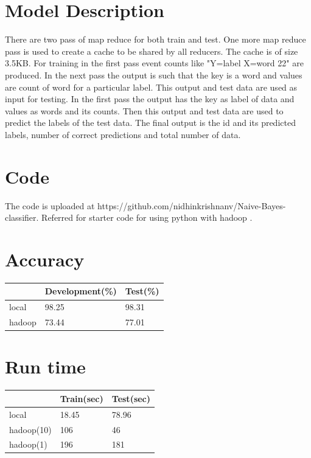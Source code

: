 \documentclass{article}
\begin{document}
\section{Model Description}
There are two pass of map reduce for both train and test. One more map reduce pass is used to create a cache to be shared by all reducers. The cache is of size 3.5KB. For training in the first pass event counts like "Y=label X=word	22" are produced. In the next pass the output is such that the key is a word and values are count of word for a particular label. This output and test data are used as input for testing. In the first pass the output has the key as label of data and values as words and its counts. Then this output and test data are used to predict the labels of the test data. The final output is the id and its predicted labels, number of correct predictions and total number of data.

\section{Code}
The code is uploaded at https://github.com/nidhinkrishnanv/Naive-Bayes-classifier. Referred \cite{website} for starter code for using python with hadoop .


\section{Accuracy}
\begin{center}
\begin{tabular}{ lll} 
 \hline
 \abovespace\belowspace
  &  Development(\%) & Test(\%)  \\ 
 \hline
  \abovespace
 local & 98.25 & 98.31 \\ 
 \belowspace
 hadoop & 73.44 & 77.01 \\ 
 \hline
\end{tabular}
\end{center}


\section{Run time}

\begin{center}
\begin{tabular}{ lll } 
 \hline
\abovespace\belowspace
  & Train(sec) & Test(sec)  \\ 
 \hline
 \abovespace
 local & 18.45 & 78.96 \\ 
 hadoop(10) & 106 & 46 \\
 \belowspace
 hadoop(1) & 196 & 181 \\ 
 \hline
\end{tabular}
\end{center}
\end{document}
